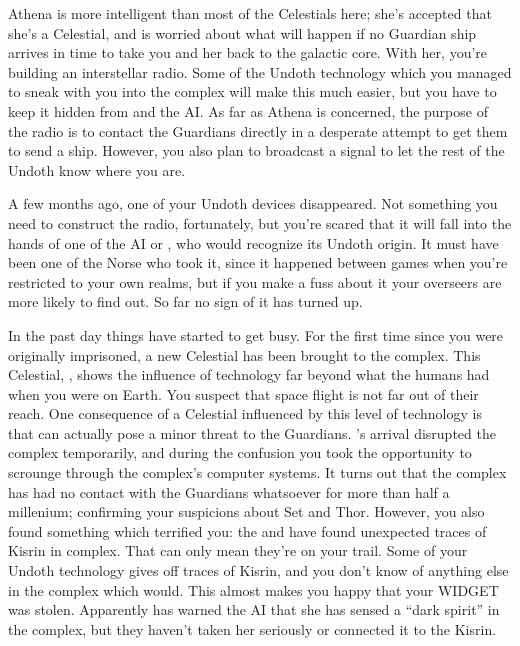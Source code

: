 \documentclass[char]{guardians}
\begin{document}
Athena is more intelligent than most of the Celestials here; she's accepted that she's a Celestial, and is worried about what will happen if no Guardian ship arrives in time to take you and her back to the galactic core. With her, you're building an interstellar radio. Some of the Undoth technology which you managed to sneak with you into the complex will make this much easier, but you have to keep it hidden from \cJascha{} and the AI. As far as Athena is concerned, the purpose of the radio is to contact the Guardians directly in a desperate attempt to get them to send a ship. However, you also plan to broadcast a signal to let the rest of the Undoth know where you are.


A few months ago, one of your Undoth devices disappeared. Not something you need to construct the radio, fortunately, but you're scared that it will fall into the hands of one of the AI or \cJascha{}, who would recognize its Undoth origin. It must have been one of the Norse who took it, since it happened between games when you're restricted to your own realms, but if you make a fuss about it your overseers are more likely to find out. So far no sign of it has turned up.

In the past day things have started to get busy. For the first time since you were originally imprisoned, a new Celestial has been brought to the complex. This Celestial, \cUnity{}, shows the influence of technology far beyond what the humans had when you were on Earth. You suspect that space flight is not far out of their reach. One consequence of a Celestial influenced by this level of technology is that \cUnity{\they} can actually pose a minor threat to the Guardians. \cUnity{}'s arrival disrupted the complex temporarily, and during the confusion you took the opportunity to scrounge through the complex's computer systems. It turns out that the complex has had no contact with the Guardians whatsoever for more than half a millenium; confirming your suspicions about Set and Thor. However, you also found something which terrified you: the \cWarden{} and \cCaretaker{} have found unexpected traces of Kisrin in complex. That can only mean they're on your trail. Some of your Undoth technology gives off traces of Kisrin, and you don't know of anything else in the complex which would. This almost makes you happy that your WIDGET was stolen. Apparently \cAmaterasu{} has warned the AI that she has sensed a ``dark spirit'' in the complex, but they haven't taken her seriously or connected it to the Kisrin.
\end{document}
